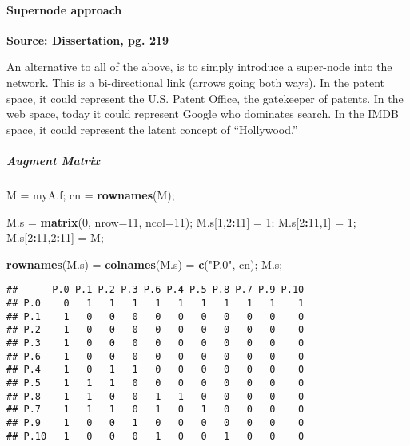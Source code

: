 \documentclass[
]{article}
\newenvironment{Shaded}{\begin{snugshade}}{\end{snugshade}}
\newcommand{\DataTypeTok}[1]{\textcolor[rgb]{0.13,0.29,0.53}{#1}}
\newcommand{\DecValTok}[1]{\textcolor[rgb]{0.00,0.00,0.81}{#1}}
\newcommand{\KeywordTok}[1]{\textcolor[rgb]{0.13,0.29,0.53}{\textbf{#1}}}
\newcommand{\NormalTok}[1]{#1}
\newcommand{\OperatorTok}[1]{\textcolor[rgb]{0.81,0.36,0.00}{\textbf{#1}}}
\newcommand{\StringTok}[1]{\textcolor[rgb]{0.31,0.60,0.02}{#1}}
\begin{document}
\hypertarget{supernode-approach}{%
\paragraph{Supernode approach}\label{supernode-approach}}

\textbf{Source: Dissertation, pg. 219}

An alternative to all of the above, is to simply introduce a super-node
into the network. This is a bi-directional link (arrows going both
ways). In the patent space, it could represent the U.S. Patent Office,
the gatekeeper of patents. In the web space, today it could represent
Google who dominates search. In the IMDB space, it could represent the
latent concept of ``Hollywood.''

\hypertarget{augment-matrix}{%
\subparagraph{Augment Matrix}\label{augment-matrix}}

\begin{Shaded}
\begin{Highlighting}[]
\NormalTok{M =}\StringTok{ }\NormalTok{myA.f;}
\NormalTok{cn =}\StringTok{ }\KeywordTok{rownames}\NormalTok{(M);}

\NormalTok{M.s =}\StringTok{ }\KeywordTok{matrix}\NormalTok{(}\DecValTok{0}\NormalTok{, }\DataTypeTok{nrow=}\DecValTok{11}\NormalTok{, }\DataTypeTok{ncol=}\DecValTok{11}\NormalTok{);}
\NormalTok{M.s[}\DecValTok{1}\NormalTok{,}\DecValTok{2}\OperatorTok{:}\DecValTok{11}\NormalTok{] =}\StringTok{ }\DecValTok{1}\NormalTok{;}
\NormalTok{M.s[}\DecValTok{2}\OperatorTok{:}\DecValTok{11}\NormalTok{,}\DecValTok{1}\NormalTok{] =}\StringTok{ }\DecValTok{1}\NormalTok{;}
\NormalTok{M.s[}\DecValTok{2}\OperatorTok{:}\DecValTok{11}\NormalTok{,}\DecValTok{2}\OperatorTok{:}\DecValTok{11}\NormalTok{] =}\StringTok{ }\NormalTok{M;}

\KeywordTok{rownames}\NormalTok{(M.s) =}\StringTok{ }\KeywordTok{colnames}\NormalTok{(M.s) =}\StringTok{ }\KeywordTok{c}\NormalTok{(}\StringTok{"P.0"}\NormalTok{, cn);}
\NormalTok{M.s;}
\end{Highlighting}
\end{Shaded}

\begin{verbatim}
##      P.0 P.1 P.2 P.3 P.6 P.4 P.5 P.8 P.7 P.9 P.10
## P.0    0   1   1   1   1   1   1   1   1   1    1
## P.1    1   0   0   0   0   0   0   0   0   0    0
## P.2    1   0   0   0   0   0   0   0   0   0    0
## P.3    1   0   0   0   0   0   0   0   0   0    0
## P.6    1   0   0   0   0   0   0   0   0   0    0
## P.4    1   0   1   1   0   0   0   0   0   0    0
## P.5    1   1   1   0   0   0   0   0   0   0    0
## P.8    1   1   0   0   1   1   0   0   0   0    0
## P.7    1   1   1   0   1   0   1   0   0   0    0
## P.9    1   0   0   1   0   0   0   0   0   0    0
## P.10   1   0   0   0   1   0   0   1   0   0    0
\end{verbatim}
\end{document}
